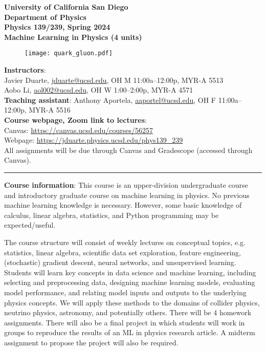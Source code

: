 \documentclass[12pt]{article}
\begin{document}
\begin{center}
	\textbf{University of California San Diego\\
		Department of Physics\\
		Physics 139/239, Spring 2024\\
		Machine Learning in Physics (4 units)}
\end{center}

\begin{figure}[h!]
	\centering
	\texttt{[image: quark\_gluon.pdf]}
\end{figure}

\noindent\textbf{Instructors}:\\
Javier Duarte, \href{mailto:jduarte@ucsd.edu}{jduarte@ucsd.edu}, OH M 11:00a--12:00p, MYR-A 5513\\
Aobo Li, \href{mailto:aol002@ucsd.edu}{aol002@ucsd.edu}, OH W 1:00--2:00p, MYR-A 4571\\
\noindent \textbf{Teaching assistant}: Anthony Aportela, \href{mailto:aaportel@ucsd.edu}{aaportel@ucsd.edu}, OH F 11:00a--12:00p, MYR-A 5516\\

\noindent\textbf{Course webpage, Zoom link to lectures}:\\
\hspace*{1cm}Canvas: \href{https://canvas.ucsd.edu/courses/56257}{https://canvas.ucsd.edu/courses/56257}\\
\hspace*{1cm}Webpage: \href{https://jduarte.physics.ucsd.edu/phys139\_239}{https://jduarte.physics.ucsd.edu/phys139\_239}\\
\hspace*{1cm}All assignments will be due through Canvas and Gradescope (accessed through Canvas).\\

\begin{center}
	\rule{\textwidth}{0.5pt}
\end{center}

\noindent\textbf{Course information}: This course is an upper-division undergraduate course and introductory graduate course on machine learning in physics.
No previous machine learning knowledge is necessary.
However, some basic knowledge of calculus, linear algebra, statistics, and Python programming may be expected/useful.

The course structure will consist of weekly lectures on conceptual topics, e.g. statistics, linear algebra, scientific data set exploration, feature engineering, (stochastic) gradient descent, neural networks, and unsupervised learning.
Students will learn key concepts in data science and machine learning, including selecting and preprocessing data, designing machine learning models, evaluating model performance, and relating model inputs and outputs to the underlying physics concepts.
We will apply these methods to the domains of collider physics, neutrino physics, astronomy, and potentially others.
There will be 4 homework assignments.
There will also be a final project in which students will work in groups to reproduce the results of an ML in physics research article.
A midterm assignment to propose the project will also be required.
\end{document}
